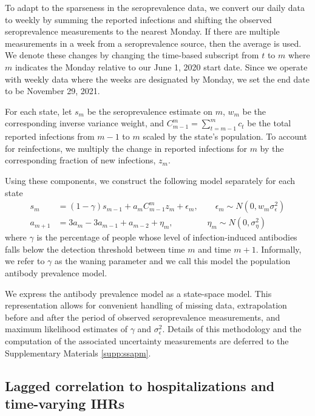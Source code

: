 \documentclass{article}
\begin{document}
 
To adapt to the sparseness in the seroprevalence data, we convert our daily data
to weekly by summing the reported infections and shifting the observed
seroprevalence measurements to the nearest Monday. If there are multiple
measurements in a week from a seroprevalence source, then the average is used.
We denote these changes by changing the time-based subscript from $t$ to $m$
where $m$ indicates the Monday relative to our June 1, 2020 start date.
Since we operate with weekly data where the weeks are designated by Monday, we set the 
end date to be November 29, 2021. 

For each state, let $s_m$ be the seroprevalence estimate on $m$, $w_m$ be the
corresponding inverse variance weight, and $C_{m-1}^m = \sum_{t = m-1}^{m} c_t$
be the total reported infections from $m-1$ to $m$ scaled by the state's
population. To account for reinfections, we multiply the change in reported
infections for $m$ by the corresponding fraction of new infections, $z_m$. 

Using these components, we construct the following model separately for each state
\begin{align}
s_m &= (1 -\gamma)s_{m-1} + a_m C_{m-1}^m z_m + \epsilon_m, \qquad \epsilon_m 
\sim N(0, w_m \sigma^2_\epsilon) \label{eq:waningpr}  \\
a_{m+1} &= 3a_{m} - 3a_{m-1} + a_{m-2} + \eta_m,\qquad\qquad \eta_m 
\sim N(0, \sigma^2_{\eta})   \nonumber
\end{align}
where $\gamma$ is the percentage of people whose level of infection-induced
antibodies falls below the detection threshold between time $m$ and time $m+1$.
Informally, we refer to $\gamma$ as the waning parameter and we call this model
the population antibody prevalence model. 

We express the antibody prevalence model as a state-space model. This
representation allows for convenient handling of missing data, extrapolation
before and after the period of observed seroprevalence measurements, and maximum
likelihood estimates of $\gamma$ and $\sigma^2_\epsilon$. Details of this
methodology and the computation of the associated uncertainty measurements are
deferred to the Supplementary Materials \ref{supp:ssapm}.


\subsection{Lagged correlation to hospitalizations and time-varying IHRs} 
\end{document}
